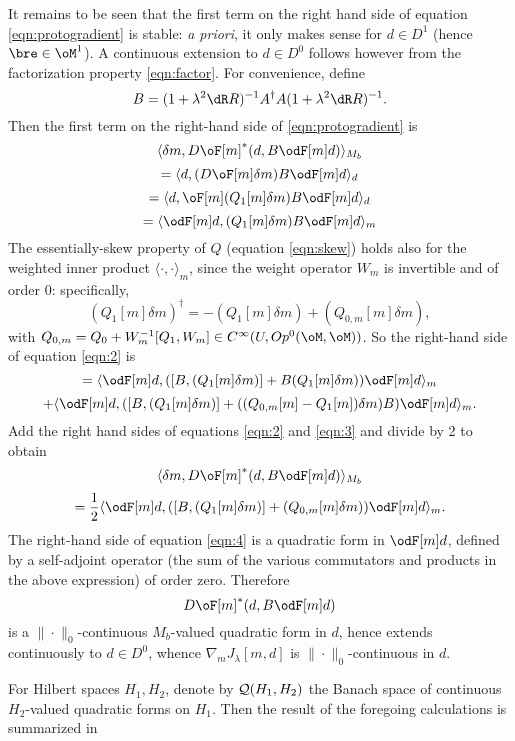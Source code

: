 It remains to be seen that the first term on the right hand side of
equation \ref{eqn:protogradient} is stable: {\em a priori}, it only
makes sense for $d\in D^1$ (hence $\bre \in \oM^1$). A continuous
extension to $d \in D^0$ follows however from the factorization
property \ref{eqn:factor}. For convenience, define 
\[
B = (1+\lambda^2\dR R)^{-1}A^{\dagger}A (1+\lambda^2 \dR R)^{-1}.
\]
Then the first term on the right-hand side of \ref{eqn:protogradient} is
\[
\langle \delta m, D\oF[m]^*(d,B\odF[m]d) \rangle_{M_b}
\]
\[
= \langle d, (D\oF[m]\delta m)B\odF[m]d \rangle_d 
\]
\[
= \langle d, \oF[m](Q_1[m]\delta m)B\odF[m]d\rangle_d
\]
\begin{equation}
\label{eqn:2}
=\langle \odF[m]d, (Q_1[m]\delta m)B\odF[m]d\rangle_m 
\end{equation}
The essentially-skew property of $Q$ (equation \ref{eqn:skew}) holds
also for the weighted inner product $\langle \cdot, \cdot \rangle_m$,
since the weight operator $W_m$ is invertible and of order 0:
specifically,
\begin{equation}
\label{eqn:skew-m}
(Q_1[m]\delta m)^{\dagger} = -(Q_1[m]\delta m) + (Q_{0,m}[m]\delta m),
\end{equation}
with $Q_{0,m} = Q_0 + W_m^{-1}[Q_1,W_m] \in C^{\infty}(U, Op^0(\oM,\oM))$.
 So the
right-hand side of equation \ref{eqn:2} is
\[
=\langle \odF[m]d, ([B,(Q_1[m]\delta m)] + B(Q_1[m]\delta m))
\odF[m]d\rangle_m 
\]
\begin{equation}
\label{eqn:3}
+\langle \odF[m]d, ([B,(Q_1[m]\delta m)] + ((Q_{0,m}[m]- Q_1[m])\delta m)B)\odF[m]d\rangle_m.
\end{equation}
Add the right hand sides of equations \ref{eqn:2} and \ref{eqn:3} and
divide by 2 to obtain
\[
\langle \delta m, D\oF[m]^*(d,B\odF[m]d) \rangle_{M_b}
\]
\begin{equation}
\label{eqn:4}
=\frac{1}{2}\langle \odF[m]d,([B,(Q_1[m]\delta m)] +
(Q_{0,m}[m]\delta m))\odF[m]d\rangle_m.
\end{equation}
The right-hand side of equation \ref{eqn:4} is a quadratic form in
$\odF[m]d$, defined by a self-adjoint operator (the sum of the various
commutators and products in the above expression) of order
zero. Therefore 
\[
D\oF[m]^*(d,B\odF[m]d)
\]
is a $\|\cdot\|_0$-continuous $M_b$-valued quadratic form in $d$,
hence extends continuously to $d \in D^0$, whence $\nabla_m J_{\lambda}[m,d]$ is
$\|\cdot\|_0$-continuous in $d$.

For Hilbert spaces $H_1, H_2$, denote by ${\cal Q}(H_1,H_2)$ the
Banach space of continuous $H_2$-valued quadratic forms on $H_1$.
Then the result of the foregoing calculations is summarized in

